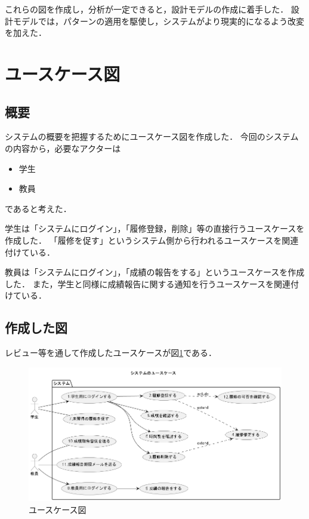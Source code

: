 \documentclass[documentclass]{jsarticle}
\begin{document}
これらの図を作成し，分析が一定できると，設計モデルの作成に着手した．
設計モデルでは，パターンの適用を駆使し，システムがより現実的になるよう改変を加えた．

\newpage

\section{ユースケース図}
\subsection*{概要}
システムの概要を把握するためにユースケース図を作成した．
今回のシステムの内容から，必要なアクターは
\begin{itemize}
  \item 学生
  \item 教員
\end{itemize}
であると考えた．

学生は「システムにログイン」，「履修登録，削除」等の直接行うユースケースを作成した．
「履修を促す」というシステム側から行われるユースケースを関連付けている．

教員は「システムにログイン」，「成績の報告をする」というユースケースを作成した．
また，学生と同様に成績報告に関する通知を行うユースケースを関連付けている．

\subsection*{作成した図}
レビュー等を通して作成したユースケースが図\ref*{fig:3-1}である．
\begin{figure}[H]
  \begin{center}
    \includegraphics*[scale=0.5]{figure/3-1.png}
  \end{center}
  \caption{ユースケース図}
  \label{fig:3-1}
\end{figure}
\end{document}
